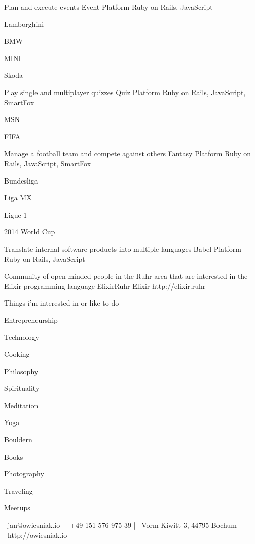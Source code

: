 \documentclass[]{awesome-cv}
\begin{document}
\begin{cventries}
	\cventry
	{Plan and execute events}
	{Event Platform}
	{Ruby on Rails, JavaScript}
	{}
	{\begin{cvitems}
		\item {Lamborghini}
		\item {BMW}
		\item {MINI}
		\item {Skoda}
	\end{cvitems}}
	
	\vspace{-2mm}
	\cventry
	{Play single and multiplayer quizzes}
	{Quiz Platform}
	{Ruby on Rails, JavaScript, SmartFox}
	{}
	{\begin{cvitems}
		\item {MSN}
		\item {FIFA}
	\end{cvitems}}
	
	\vspace{-2mm}
	\cventry
	{Manage a football team and compete against others}
	{Fantasy Platform}
	{Ruby on Rails, JavaScript, SmartFox}
	{}
	{\begin{cvitems}
		\item {Bundesliga}
		\item {Liga MX}
		\item {Ligue 1}
		\item {2014 World Cup}
	\end{cvitems}}
	
	\vspace{-2mm}
	\cventry
	{Translate internal software products into multiple languages}
	{Babel Platform}
	{Ruby on Rails, JavaScript}
	{}
	{}
	
	\vspace{-2mm}
	\cventry
	{Community of open minded people in the Ruhr area that are interested in the Elixir programming language}
	{ElixirRuhr}
	{Elixir}
	{http://elixir.ruhr}
	{}
\end{cventries}

\vspace{-2mm}
\begin{cventries}
	\cventry
	{Things i'm interested in or like to do}
	{}
	{}
	{}
	{\begin{cvitems}
		\item {Entrepreneurship}
		\item {Technology}
		\item {Cooking}
		\item {Philosophy}
		\item {Spirituality}
		\item {Meditation}
		\item {Yoga}
		\item {Bouldern}
		\item {Books}
		\item {Photography}
		\item {Traveling}
		\item {Meetups}
		\end{cvitems}}
\end{cventries}
    
 \begin{center}
	\vspace{\fill}
	{\faEnvelope\ jan@owiesniak.io} | {\faMobile\ +49 151 576 975 39} | {\faMapMarker\ Vorm Kiwitt 3, 44795 Bochum} | {\faLink\ http://owiesniak.io}
\end{center}
\ 
\end{document}
